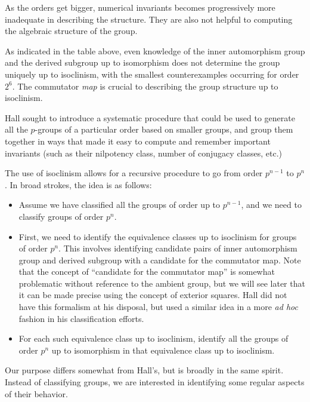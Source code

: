 \vspace{0.3in}

As the orders get bigger, numerical invariants becomes progressively
more inadequate in describing the structure. They are also not helpful
to computing the algebraic structure of the group.

As indicated in the table above, even knowledge of the inner
automorphism group and the derived subgroup up to isomorphism does not
determine the group uniquely up to isoclinism, with the smallest
counterexamples occurring for order $2^6$. The commutator {\em map} is
crucial to describing the group structure up to isoclinism.

Hall sought to introduce a systematic procedure that could be used to
generate all the $p$-groups of a particular order based on smaller
groups, and group them together in ways that made it easy to compute
and remember important invariants (such as their nilpotency class,
number of conjugacy classes, etc.)

The use of isoclinism allows for a recursive procedure to go from
order $p^{n-1}$ to $p^n$. In broad strokes, the idea is as follows:

\begin{itemize}
\item Assume we have classified all the groups of order up to
  $p^{n-1}$, and we need to classify groups of order $p^n$.

\item First, we need to identify the equivalence classes up to
  isoclinism for groups of order $p^n$. This involves identifying
  candidate pairs of inner automorphism group and derived subgroup
  with a candidate for the commutator map. Note that the concept of
  ``candidate for the commutator map'' is somewhat problematic without
  reference to the ambient group, but we will see later that it can be
  made precise using the concept of exterior squares. Hall did not
  have this formalism at his disposal, but used a similar idea in a
  more {\em ad hoc} fashion in his classification efforts.

\item For each such equivalence class up to isoclinism, identify all
  the groups of order $p^n$ up to isomorphism in that equivalence
  class up to isoclinism.

\end{itemize}

Our purpose differs somewhat from Hall's, but is broadly in the same
spirit. Instead of classifying groups, we are interested in
identifying some regular aspects of their behavior.

